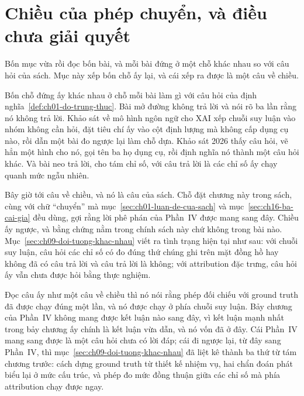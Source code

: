 \section{Chiều của phép chuyển, và điều chưa giải quyết}
\label{sec:ch17-chieu-cua-phep-chuyen}

%
Bốn mục vừa rồi đọc bốn bài, và mỗi bài đứng ở một chỗ khác nhau so với câu hỏi
của sách. Mục này xếp bốn chỗ ấy lại, và cái xếp ra được là một câu về chiều.

%
Bốn chỗ đứng ấy khác nhau ở chỗ mỗi bài làm gì với câu hỏi của
định nghĩa~\ref{def:ch01-do-trung-thuc}. Bài mở đường không trả lời và nói rõ ba
lần rằng nó không trả lời. Khảo sát về mô hình ngôn ngữ cho XAI xếp chuỗi suy
luận vào nhóm không cần hỏi, đặt tiêu chí ấy vào cột định lượng mà không cấp dụng
cụ nào, rồi dẫn một bài đo ngược lại làm chỗ dựa. Khảo sát 2026 thấy câu hỏi, vẽ
hẳn một hình cho nó, gọi tên ba họ dụng cụ, rồi định nghĩa nó thành một câu hỏi
khác. Và bài neo trả lời, cho tám chỉ số, với câu trả lời là các chỉ số ấy chạy
quanh mức ngẫu nhiên.

%
Bây giờ tới câu về chiều, và nó là câu của sách. Chỗ đặt chương này trong sách,
cùng với chữ \enquote{chuyển} mà mục~\ref{sec:ch01-luan-de-cua-sach} và
mục~\ref{sec:ch16-ba-cai-gia} đều dùng, gợi rằng lời phê phán của Phần~IV được
mang sang đây. Chiều ấy ngược, và bằng chứng nằm trong chính sách này chứ không
trong bài nào.
Mục~\ref{sec:ch09-doi-tuong-khac-nhau} viết ra tình trạng hiện tại như sau: với
chuỗi suy luận, câu hỏi các chỉ số có đo đúng thứ chúng ghi trên mặt đồng hồ hay
không đã có câu trả lời và câu trả lời là không; với attribution đặc trưng, câu
hỏi ấy vẫn chưa được hỏi bằng thực nghiệm.

Đọc câu ấy như một câu về chiều thì nó nói rằng phép đối chiếu với ground truth
đã được chạy đúng một lần, và nó được chạy ở phía chuỗi suy luận. Bảy chương của
Phần~IV không mang được kết luận nào sang đây, vì kết luận mạnh nhất trong bảy
chương ấy chính là kết luận vừa dẫn, và nó vốn đã ở đây. Cái Phần~IV mang sang
được là một câu hỏi chưa có lời đáp; cái đi ngược lại, từ đây sang Phần~IV, thì
mục~\ref{sec:ch09-doi-tuong-khac-nhau} đã liệt kê thành ba thứ từ tám chương
trước: cách dựng ground truth từ thiết kế nhiệm vụ, hai chẩn đoán phát biểu lại ở
mức cấu trúc, và phép đo mức đồng thuận giữa các chỉ số mà phía attribution chạy
được ngay.

